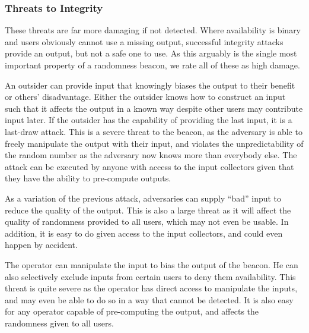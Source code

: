 \subsubsection{Threats to Integrity}
These threats are far more damaging if not detected. Where availability is binary and users obviously cannot use a missing output, successful integrity attacks provide an output, but not a safe one to use. As this arguably is the single most important property of a randomness beacon, we rate all of these as high damage. 

An outsider can provide input that knowingly biases the output to their benefit or others' disadvantage.
Either the outsider knows how to construct an input such that it affects the output in a known way despite other users may contribute input later.
If the outsider has the capability of providing the last input, it is a last-draw attack.
This is a severe threat to the beacon, as the adversary is able to freely manipulate the output with their input, and violates the unpredictability of the random number as the adversary now knows more than everybody else.
The attack can be executed by anyone with access to the input collectors given that they have the ability to pre-compute outputs.

As a variation of the previous attack, adversaries can supply \enquote{bad} input to reduce the quality of the output.
This is also a large threat as it will affect the quality of randomness provided to all users, which may not even be usable.
In addition, it is easy to do given access to the input collectors, and could even happen by accident.

The operator can manipulate the input to bias the output of the beacon.
He can also selectively exclude inputs from certain users to deny them availability.
This threat is quite severe as the operator has direct access to manipulate the inputs, and may even be able to do so in a way that cannot be detected.
It is also easy for any operator capable of pre-computing the output, and affects the randomness given to all users.

